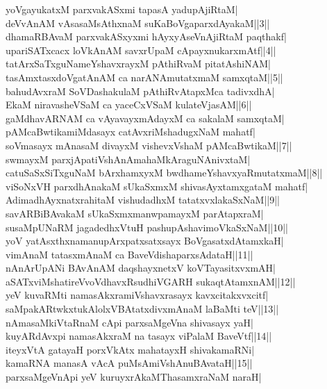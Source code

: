 \documentclass{article}
\begin{document}
yoVgayukatxM parxvakASxmi tapasA yadupAjiRtaM|\\
deVvAnAM vAsasaMsAthxnaM suKaBoVgaparxdAyakaM||3||\\
dhamaRBAvaM parxvakASxyxmi hAyxyAseVnAjiRtaM paqthakf|\\
upariSATxcacx loVkAnAM savxrUpaM cApayxnukarxmAtf||4||\\
tatArxSaTxguNameYshavxrayxM pAthiRvaM pitatAshiNAM|\\
tasAmxtasxdoVgatAnAM ca narANAmutatxmaM samxqtaM||5||\\
bahudAvxraM SoVDashakulaM pAthiRvAtapxMca tadivxdhA|\\
EkaM niravasheVSaM ca yaceCxVSaM kulateVjasAM||6||\\
gaMdhavARNAM ca vAyavayxmAdayxM ca sakalaM samxqtaM|\\
pAMcaBwtikamiMdasayx catAvxriMshadugxNaM mahatf|\\
soVmasayx mAnasaM divayxM vishevxVshaM pAMcaBwtikaM||7||\\
swmayxM parxjApatiVshAnAmahaMkAraguNAnivxtaM|\\
catuSaSxSiTxguNaM bArxhamxyxM bwdhameYshavxyaRmutatxmaM||8||\\
viSoNxVH parxdhAnakaM sUkaSxmxM shivasAyxtamxgataM mahatf|\\
AdimadhAyxnatxrahitaM vishudadhxM tatatxvxlakaSxNaM||9||\\
savARBiBAvakaM sUkaSxmxmanwpamayxM parAtapxraM|\\
susaMpUNaRM jagadedhxVtuH pashupAshavimoVkaSxNaM||10||\\
yoV yatAsxthxnamanupArxpatxsatxsayx BoVgasatxdAtamxkaH|\\
vimAnaM tatasxmAnaM ca BaveVdishaparxsAdataH||11||\\
nAnArUpANi BAvAnAM daqshayxnetxV koVTayasitxvxmAH|\\
aSATxviMshatireVvoVdhavxRsudhiVGARH sukaqtAtamxnAM||12||\\
yeV kuvaRMti namasAkxramiVshavxrasayx kavxcitakxvxcitf|\\
saMpakARtwkxtukAlolxVBAtatxdivxmAnaM laBaMti teV||13||\\
nAmasaMkiVtaRnaM cApi parxsaMgeVna shivasayx yaH|\\
kuyARdAvxpi namasAkxraM na tasayx viPalaM BaveVtf||14||\\
iteyxVtA gatayaH porxVkAtx mahatayxH shivakamaRNi|\\
kamaRNA manasA vAcA puMsAmiVshAnuBAvataH||15||\\
parxsaMgeVnApi yeV kuruyxrAkaMThasamxraNaM naraH|\\
\end{document}
